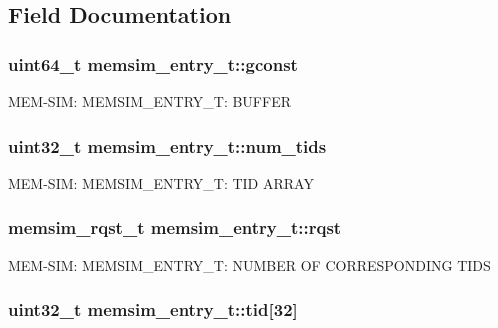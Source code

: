 \subsection{Field Documentation}
\hypertarget{structmemsim__entry__t_a5e6fc38a3aa83e0c1ec7fcf9e1cf2563}{
\subsubsection[{gconst}]{\setlength{\rightskip}{0pt plus 5cm}uint64\-\_\-t memsim\-\_\-entry\-\_\-t\-::gconst}}\label{structmemsim__entry__t_a5e6fc38a3aa83e0c1ec7fcf9e1cf2563}
M\-E\-M-\/\-S\-I\-M\-: M\-E\-M\-S\-I\-M\-\_\-\-E\-N\-T\-R\-Y\-\_\-\-T\-: B\-U\-F\-F\-E\-R \hypertarget{structmemsim__entry__t_a4930ffc1bfc88eb13462c97d5cdeb776}{
\subsubsection[{num\-\_\-tids}]{\setlength{\rightskip}{0pt plus 5cm}uint32\-\_\-t memsim\-\_\-entry\-\_\-t\-::num\-\_\-tids}}\label{structmemsim__entry__t_a4930ffc1bfc88eb13462c97d5cdeb776}
M\-E\-M-\/\-S\-I\-M\-: M\-E\-M\-S\-I\-M\-\_\-\-E\-N\-T\-R\-Y\-\_\-\-T\-: T\-I\-D A\-R\-R\-A\-Y \hypertarget{structmemsim__entry__t_a0bd6994a034a78c0d2b8d2adfc0cf2bd}{
\subsubsection[{rqst}]{\setlength{\rightskip}{0pt plus 5cm}memsim\-\_\-rqst\-\_\-t memsim\-\_\-entry\-\_\-t\-::rqst}}\label{structmemsim__entry__t_a0bd6994a034a78c0d2b8d2adfc0cf2bd}
M\-E\-M-\/\-S\-I\-M\-: M\-E\-M\-S\-I\-M\-\_\-\-E\-N\-T\-R\-Y\-\_\-\-T\-: N\-U\-M\-B\-E\-R O\-F C\-O\-R\-R\-E\-S\-P\-O\-N\-D\-I\-N\-G T\-I\-D\-S \hypertarget{structmemsim__entry__t_ae991f3a825c085a21997def9c86b26ee}{
\subsubsection[{tid}]{\setlength{\rightskip}{0pt plus 5cm}uint32\-\_\-t memsim\-\_\-entry\-\_\-t\-::tid\mbox{[}32\mbox{]}}}\label{structmemsim__entry__t_ae991f3a825c085a21997def9c86b26ee}
